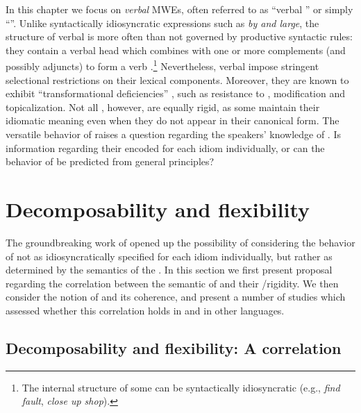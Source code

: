 \documentclass[output=paper]{langsci/langscibook}
\begin{document}
In this chapter we focus on \emph{verbal} MWEs, often referred to as ``verbal '' or simply ``''.
Unlike syntactically idiosyncratic expressions such as \textit{by and
  large}, the structure of verbal  is more often than not
governed by productive syntactic rules: they contain a verbal head
which combines with one or more complements (and possibly adjuncts) to
form a verb .\footnote{The internal structure of some  can be syntactically idiosyncratic (e.g., \textit{find fault}, \textit{close up shop}).}
Nevertheless, verbal  impose stringent selectional restrictions on
their lexical components. Moreover, they are known to exhibit
``transformational deficiencies'' \citep[111]{chafe1968idiomaticity},
such as resistance to , modification and topicalization. Not
all , however, are equally rigid, as some maintain their idiomatic
meaning even when they do not appear in their canonical form. The versatile behavior of  raises a question regarding the
speakers' knowledge of . Is information regarding their
 encoded for each idiom individually, or can the behavior
of  be predicted from general principles?


\section{Decomposability and flexibility}
\label{she:sec:decomp}

The groundbreaking work of \citet{nunberg94} opened up the possibility
of considering the behavior of  not as idiosyncratically specified for
each idiom individually, but rather as determined by the semantics of
the . In this section we first present  proposal regarding the correlation between the semantic  of  and their /rigidity. We then consider the notion of  and its coherence, and present a number of studies which assessed whether this correlation holds in  and in other languages.


\subsection{Decomposability and flexibility: A correlation}
\end{document}
